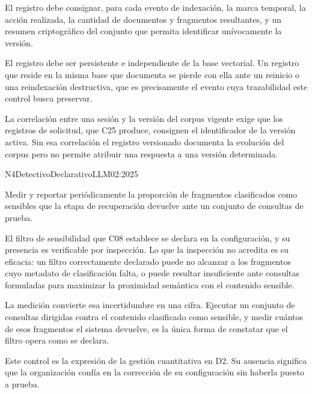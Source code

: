 El registro debe consignar, para cada evento de indexación, la marca temporal, la acción realizada, la cantidad de documentos y fragmentos resultantes, y un resumen criptográfico del conjunto que permita identificar unívocamente la versión.

El registro debe ser persistente e independiente de la base vectorial. Un registro que reside en la misma base que documenta se pierde con ella ante un reinicio o una reindexación destructiva, que es precisamente el evento cuya trazabilidad este control busca preservar.

La correlación entre una sesión y la versión del corpus vigente exige que los registros de solicitud, que C25 produce, consignen el identificador de la versión activa. Sin esa correlación el registro versionado documenta la evolución del corpus pero no permite atribuir una respuesta a una versión determinada.


  {N4}{Detectivo}{Declarativo}{LLM02:2025}

Medir y reportar periódicamente la proporción de fragmentos clasificados como sensibles que la etapa de recuperación devuelve ante un conjunto de consultas de prueba.

El filtro de sensibilidad que C08 establece se declara en la configuración, y su presencia es verificable por inspección. Lo que la inspección no acredita es su eficacia: un filtro correctamente declarado puede no alcanzar a los fragmentos cuyo metadato de clasificación falta, o puede resultar insuficiente ante consultas formuladas para maximizar la proximidad semántica con el contenido sensible.

La medición convierte esa incertidumbre en una cifra. Ejecutar un conjunto de consultas dirigidas contra el contenido clasificado como sensible, y medir cuántos de esos fragmentos el sistema devuelve, es la única forma de constatar que el filtro opera como se declara.

Este control es la expresión de la gestión cuantitativa en D2. Su ausencia significa que la organización confía en la corrección de su configuración sin haberla puesto a prueba.

